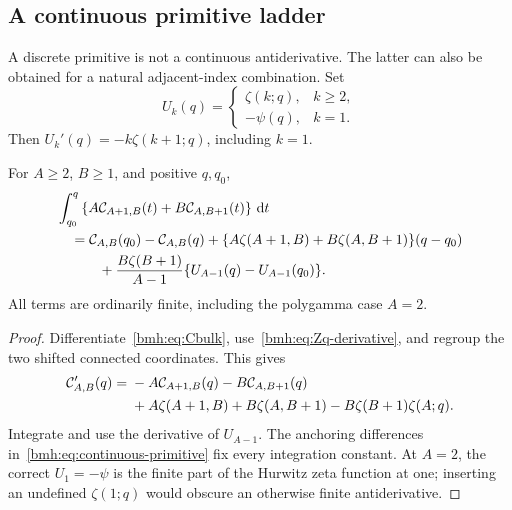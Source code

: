 \subsection{A continuous primitive ladder}
A discrete primitive is not a continuous antiderivative. The latter can
also be obtained for a natural adjacent-index combination. Set
\begin{equation}\label{bmh:eq:U}
 U_k(q)=\begin{cases}\zeta(k;q),&k\ge2,\\-\psi(q),&k=1.
 \end{cases}
\end{equation}
Then $U_k'(q)=-k\zeta(k+1;q)$, including $k=1$.

\begin{proposition}
\label{bmh:prop:continuous-primitive}
For $A\ge2$, $B\ge1$, and positive $q,q_0$,
\begin{align}
 &\int_{q_0}^{q}\left\{A\mathcal C_{A+1,B}(t)+B\mathcal C_{A,B+1}(t)\right\}\,\mathrm d t
 \notag\\
 &\quad=\mathcal C_{A,B}(q_0)-\mathcal C_{A,B}(q)
 +\{A\zeta(A+1,B)+B\zeta(A,B+1)\}(q-q_0)\notag\\
 &\qquad\quad+
 \frac{B\zeta(B+1)}{A-1}
       \{U_{A-1}(q)-U_{A-1}(q_0)\}.
 \label{bmh:eq:continuous-primitive}
\end{align}
All terms are ordinarily finite, including the polygamma case $A=2$.
\end{proposition}
\begin{proof}
Differentiate~\eqref{bmh:eq:Cbulk}, use~\eqref{bmh:eq:Zq-derivative},
and regroup the two shifted connected coordinates. This gives
\begin{align}
 \mathcal C_{A,B}'(q)={}&-A\mathcal C_{A+1,B}(q)-B\mathcal C_{A,B+1}(q)\notag\\
 &+A\zeta(A+1,B)+B\zeta(A,B+1)
       -B\zeta(B+1)\zeta(A;q).
 \label{bmh:eq:C-differential}
\end{align}
Integrate and use the derivative of $U_{A-1}$. The anchoring differences
in~\eqref{bmh:eq:continuous-primitive} fix every integration constant.
At $A=2$, the correct $U_1=-\psi$ is the finite part of the Hurwitz
zeta function at one; inserting an undefined $\zeta(1;q)$ would obscure
an otherwise finite antiderivative.
\end{proof}

